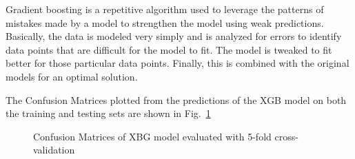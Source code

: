 \documentclass[runningheads]{llncs}
\makeatletter
\let\oldparagraph\paragraph
\renewcommand\paragraph{\@ifstar{\oldparagraph}{\oldparagraph*}}
\makeatother
\begin{document}
\hypertarget{gradient-boosting}{%
\paragraph{Gradient Boosting}\label{gradient-boosting}}

Gradient boosting is a repetitive algorithm used to leverage the
patterns of mistakes made by a model to strengthen the model using weak
predictions. Basically, the data is modeled very simply and is analyzed
for errors to identify data points that are difficult for the model to
fit. The model is tweaked to fit better for those particular data
points. Finally, this is combined with the original models for an
optimal solution.

The Confusion Matrices plotted from the predictions of the XGB model on
both the training and testing sets are shown in Fig.~\ref{fig:xgb_cf}

\begin{figure}
\centering


\caption{Confusion Matrices of XBG model evaluated with 5-fold
cross-validation}

\label{fig:xgb_cf}

\end{figure}
\end{document}
